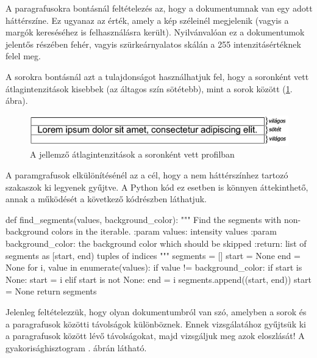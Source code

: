 

A paragrafusokra bontásnál feltételezés az, hogy a dokumentumnak van egy adott háttérszíne. Ez ugyanaz az érték, amely a kép széleinél megjelenik (vagyis a margók kereséséhez is felhasználásra került). Nyilvánvalóan ez a dokumentumok jelentős részében fehér, vagyis szürkeárnyalatos skálán a 255 intenzitásértéknek felel meg.

A sorokra bontásnál azt a tulajdonságot használhatjuk fel, hogy a soronként vett átlagintenzitások kisebbek (az áltagos szín sötétebb), mint a sorok között (\ref{fig:line}. ábra).

\begin{figure}[h!]
\centering
\includegraphics[scale=1]{images/line.png}
\caption{A jellemző átlagintenzitások a soronként vett profilban}
\label{fig:line}
\end{figure}

A paramgrafusok elkülönítésénél az a cél, hogy a nem háttérszínhez tartozó szakaszok ki legyenek gyűjtve.
A Python kód ez esetben is könnyen áttekinthető, annak a működését a következő kódrészben láthatjuk.
\begin{python}
def find_segments(values, background_color):
    """
    Find the segments with non-background colors in the iterable.
    :param values: intensity values
    :param background_color: the background color which should be skipped
    :return: list of segments as [start, end) tuples of indices
    """
    segments = []
    start = None
    end = None
    for i, value in enumerate(values):
        if value != background_color:
            if start is None:
                start = i
        elif start is not None:
            end = i
            segments.append((start, end))
            start = None
    return segments
\end{python}


Jelenleg feltételezzük, hogy olyan dokumentumbról van szó, amelyben a sorok és a paragrafusok közötti távolságok különböznek.
Ennek vizsgálatához gyűjtsük ki a paragrafusok között lévő távolságokat, majd vizsgáljuk meg azok eloszlását! A gyakorisághisztogram . ábrán látható.

